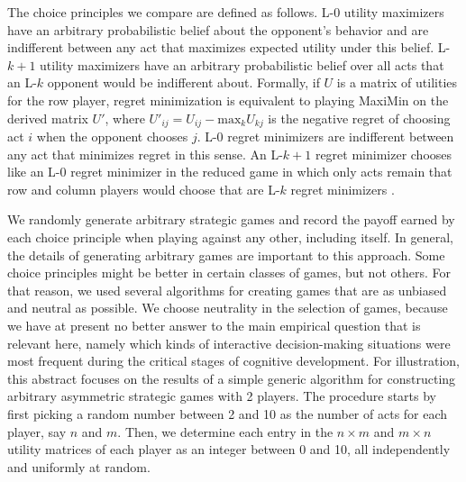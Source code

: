 \documentclass{llncs}
\begin{document}
The choice principles we compare are defined as follows. L-0 utility
maximizers have an arbitrary probabilistic belief about the opponent's
behavior and are indifferent between any act that maximizes expected
utility under this belief. L-$k+1$ utility maximizers have an
arbitrary probabilistic belief over all acts that an L-$k$ opponent
would be indifferent about. Formally, if $U$ is a matrix of utilities
for the row player, regret minimization is equivalent to playing
MaxiMin on the derived matrix $U'$, where $U'_{ij} = U_{ij} -
\textrm{max}_{k} U_{kj}$ is the negative regret of choosing act $i$
when the opponent chooses $j$. L-0 regret minimizers are indifferent
between any act that minimizes regret in this sense. An L-$k+1$ regret
minimizer chooses like an L-0 regret minimizer in the reduced game in
which only acts remain that row and column players would choose that
are L-$k$ regret minimizers
\citep[see][]{HalpernPass2012:Iterated-Regret}.

We randomly generate arbitrary strategic games and record the payoff
earned by each choice principle when playing against any other,
including itself. In general, the details of generating arbitrary
games are important to this approach. Some choice principles might be
better in certain classes of games, but not others. For that reason,
we used several algorithms for creating games that are as unbiased and
neutral as possible. We choose neutrality in the selection of games,
because we have at present no better answer to the main empirical
question that is relevant here, namely which kinds of interactive
decision-making situations were most frequent during the critical
stages of cognitive development. For illustration, this abstract
focuses on the results of a simple generic algorithm for constructing
arbitrary asymmetric strategic games with 2 players. The procedure
starts by first picking a random number between 2 and 10 as the number
of acts for each player, say $n$ and $m$. Then, we determine each
entry in the $n \times m$ and $m \times n$ utility matrices of each
player as an integer between 0 and 10, all independently and uniformly
at random.

 
\end{document}
